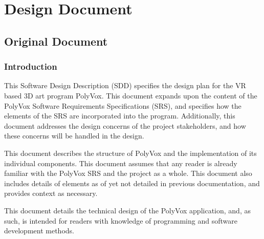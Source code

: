 \documentclass[onecolumn, draftclsnofoot,10pt, compsoc]{IEEEtran}
\newcounter{threesection}[subsubsection]
\begin{document}
\pagebreak
\section{Design Document}

\subsection{Original Document}

\subsubsection{Introduction}

This Software Design Description (SDD) specifies the design plan for the VR based 3D art program PolyVox.
This document expands upon the content of the PolyVox Software Requirements Specifications (SRS), and specifies how the elements of the SRS are incorporated into the program.
Additionally, this document addresses the design concerns of the project stakeholders, and how these concerns will be handled in the design. 

This document describes the structure of PolyVox and the implementation of its individual components.
This document assumes that any reader is already familiar with the PolyVox SRS and the project as a whole.
This document also includes details of elements as of yet not detailed in previous documentation, and provides context as necessary.

This document details the technical design of the PolyVox application, and, as such, is intended for readers with knowledge of programming and software development methods. 
\end{document}
